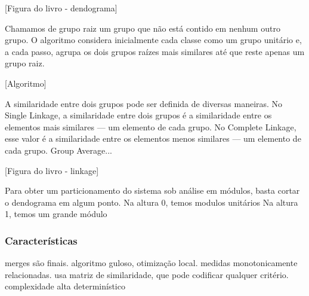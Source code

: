   [Figura do livro - dendograma]

Chamamos de grupo raiz um grupo que não está contido em nenhum outro
grupo.
O algoritmo considera inicialmente cada classe como um grupo unitário e, a 
cada passo, agrupa os dois grupos raízes mais similares 
até que reste apenas um grupo raiz.

  [Algoritmo]

A similaridade entre dois grupos pode ser definida de diversas maneiras.
No Single Linkage, a similaridade entre dois grupos é a similaridade
entre os elementos mais similares --- um elemento de cada grupo.
No Complete Linkage, esse valor é a similaridade entre
os elementos menos similares --- um elemento de cada grupo.
Group Average...

  [Figura do livro - linkage]

Para obter um particionamento do sistema sob análise em módulos, basta
cortar o dendograma em algum ponto. 
Na altura 0, temos modulos unitários
Na altura 1, temos um grande módulo

\subsubsection{Características}

merges são finais.
algoritmo guloso, otimização local.
medidas monotonicamente relacionadas.
usa matriz de similaridade, que pode codificar qualquer critério.
complexidade alta
determinístico

% 
% 
% 
% 
% 
% 
% 
% 



